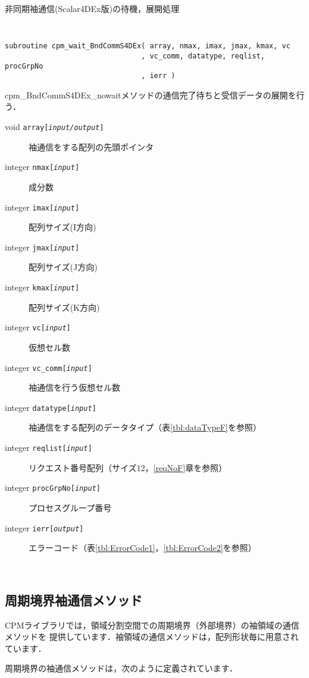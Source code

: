 \begin{spacing}{0.8}
\begin{itembox}[l]{非同期袖通信(Scalar4DEx版)の待機，展開処理}
{\tt
\begin{verbatim}
subroutine cpm_wait_BndCommS4DEx( array, nmax, imax, jmax, kmax, vc
                                , vc_comm, datatype, reqlist, procGrpNo
                                , ierr )
\end{verbatim}
}
cpm\_BndCommS4DEx\_nowaitメソッドの通信完了待ちと受信データの展開を行う．
\begin{description}
\item[void    {\tt array[{\it input/output}]}] 袖通信をする配列の先頭ポインタ
\item[integer {\tt nmax[{\it input}]}] 成分数
\item[integer {\tt imax[{\it input}]}] 配列サイズ(I方向)
\item[integer {\tt jmax[{\it input}]}] 配列サイズ(J方向)
\item[integer {\tt kmax[{\it input}]}] 配列サイズ(K方向)
\item[integer {\tt vc[{\it input}]}] 仮想セル数
\item[integer {\tt vc\_comm[{\it input}]}] 袖通信を行う仮想セル数
\item[integer {\tt datatype[{\it input}]}] 袖通信をする配列のデータタイプ（表\ref{tbl:dataTypeF}を参照）
\item[integer {\tt reqlist[{\it input}]}] リクエスト番号配列（サイズ12，\ref{reqNoF}章を参照）
\item[integer {\tt procGrpNo[{\it input}]}] プロセスグループ番号
\item[integer {\tt ierr[{\it output}]}] エラーコード（表\ref{tbl:ErrorCode1}，\ref{tbl:ErrorCode2}を参照）
\end{description}
\end{itembox}\\
\end{spacing}


\clearpage


\subsection{周期境界袖通信メソッド}
\label{pericommF}
CPMライブラリでは，領域分割空間での周期境界（外部境界）の袖領域の通信メソッドを
提供しています．袖領域の通信メソッドは，配列形状毎に用意されています．

周期境界の袖通信メソッドは，次のように定義されています．

